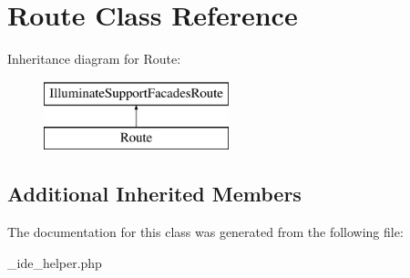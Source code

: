 \hypertarget{class_route}{}\section{Route Class Reference}
\label{class_route}
Inheritance diagram for Route\+:\begin{figure}[H]
\begin{center}
\leavevmode
\includegraphics[height=2.000000cm]{class_route}
\end{center}
\end{figure}
\subsection*{Additional Inherited Members}


The documentation for this class was generated from the following file\+:\begin{DoxyCompactItemize}
\item 
\+\_\+ide\+\_\+helper.\+php\end{DoxyCompactItemize}
